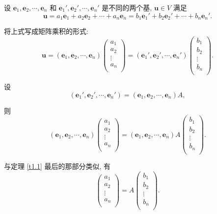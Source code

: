 \documentclass[color=black,device=normal,lang=cn,mode=geye]{elegantnote}
\begin{document}
设 $\boldsymbol{e}_1,\boldsymbol{e}_2,\cdots,\boldsymbol{e}_n$ 和 $\boldsymbol{e}_1',\boldsymbol{e}_2',\cdots,\boldsymbol{e}_n'$ 是不同的两个基, $\boldsymbol{u}\in V$ 满足
\[\boldsymbol{u}=a_1\boldsymbol{e}_1+a_2\boldsymbol{e}_2+\cdots+a_n\boldsymbol{e}_n=b_1\boldsymbol{e}_1'+b_2\boldsymbol{e}_2'+\cdots+b_n\boldsymbol{e}_n'.\]

将上式写成矩阵乘积的形式:
\[\boldsymbol{u}=(\boldsymbol{e}_1,\boldsymbol{e}_2,\cdots,\boldsymbol{e}_n)\begin{pmatrix}
    a_1 \\
    a_2 \\
    \vdots \\
    a_n \\
\end{pmatrix}=(\boldsymbol{e}_1',\boldsymbol{e}_2',\cdots,\boldsymbol{e}_n')\begin{pmatrix}
    b_1 \\
    b_2 \\
    \vdots \\
    b_n \\
\end{pmatrix}.\]

设
\[(\boldsymbol{e}_1',\boldsymbol{e}_2',\cdots,\boldsymbol{e}_n')=(\boldsymbol{e}_1,\boldsymbol{e}_2,\cdots,\boldsymbol{e}_n)A,\]

则
\[(\boldsymbol{e}_1,\boldsymbol{e}_2,\cdots,\boldsymbol{e}_n)\begin{pmatrix}
    a_1 \\
    a_2 \\
    \vdots \\
    a_n \\
\end{pmatrix}=(\boldsymbol{e}_1,\boldsymbol{e}_2,\cdots,\boldsymbol{e}_n)A\begin{pmatrix}
    b_1 \\
    b_2 \\
    \vdots \\
    b_n \\
\end{pmatrix}.\]

与定理 \ref{t1.1} 最后的那部分类似, 有
\[\begin{pmatrix}
    a_1 \\
    a_2 \\
    \vdots \\
    a_n \\
\end{pmatrix}=A\begin{pmatrix}
    b_1 \\
    b_2 \\
    \vdots \\
    b_n \\
\end{pmatrix}.\]
\end{document}
